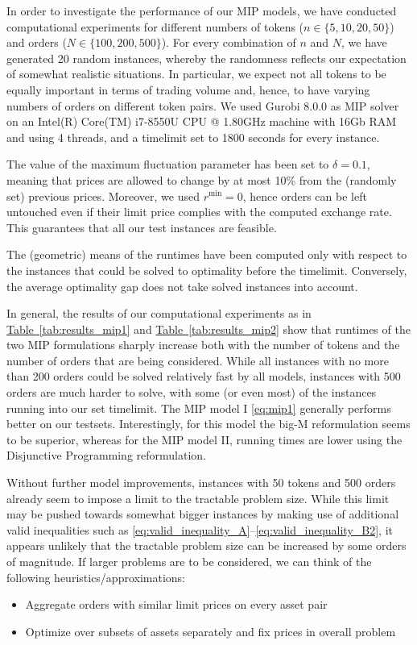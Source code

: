 \documentclass[11pt,parskip=full]{scrartcl}%
\newcommand*{\wrt}{with respect to }
\newcommand*{\Min}{\mathrm{min}}
\newcommand*{\tabref}[1]{\hyperref[{#1}]{Table~\ref*{#1}}}
\begin{document}
In order to investigate the performance of our MIP models, we have conducted computational
experiments for different numbers of tokens ($ n \in \{5,10,20,50\} $) and orders ($ N \in 
\{100,200,500\} $).
For every combination of $ n $ and $ N $, we have generated 20 random instances, whereby the
randomness reflects our expectation of somewhat realistic situations.
In particular, we expect not all tokens to be equally important in terms of trading volume and,
hence, to have varying numbers of orders on different token pairs.
We used Gurobi 8.0.0 as MIP solver on an Intel(R) Core(TM) i7-8550U CPU @ 1.80GHz machine with 16Gb
RAM and using 4 threads, and a timelimit set to 1800 seconds for every instance.

The value of the maximum fluctuation parameter has been set to $ \delta = 0.1 $, meaning that
prices are allowed to change by at most 10\% from the (randomly set) previous prices.
Moreover, we used $ r^\Min = 0 $, hence orders can be left untouched even if their limit price
complies with the computed exchange rate.
This guarantees that all our test instances are feasible.

The (geometric) means of the runtimes have been computed only \wrt the instances that could be
solved to optimality before the timelimit. Conversely, the average optimality gap does not take
solved instances into account.

In general, the results of our computational experiments as in \tabref{tab:results_mip1} and 
\tabref{tab:results_mip2} show that runtimes of the two MIP formulations sharply increase both with
the number of tokens and the number of orders that are being considered.
While all instances with no more than 200 orders could be solved relatively fast by all models,
instances with 500 orders are much harder to solve, with some (or even most) of the instances
running into our set timelimit.
The MIP model I \eqref{eq:mip1} generally performs better on our testsets.
Interestingly, for this model the big-M reformulation seems to be superior, whereas for the MIP
model II, running times are lower using the Disjunctive Programming reformulation.

Without further model improvements, instances with 50 tokens and 500 orders already seem to impose
a limit to the tractable problem size.
While this limit may be pushed towards somewhat bigger instances by making use of additional valid
inequalities such as \eqref{eq:valid_inequality_A}--\eqref{eq:valid_inequality_B2},
it appears unlikely that the tractable problem size can be increased by some orders of magnitude.
If larger problems are to be considered, we can think of the following heuristics/approximations:
\begin{itemize}
    \item Aggregate orders with similar limit prices on every asset pair
    \item Optimize over subsets of assets separately and fix prices in overall problem
\end{itemize}
\end{document}
